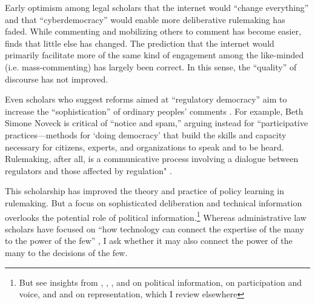 Early optimism among legal scholars that the internet would ``change everything'' \citep{Johnson1998} and that ``cyberdemocracy''  would enable more deliberative rulemaking has faded.  
While commenting and mobilizing others to comment has become easier, \citet{Coglianese2006} finds that little else has changed. %
The prediction that the internet would primarily facilitate more of the same kind of engagement among the like-minded (i.e. mass-commenting) \citep{Sunstein2001} has largely been correct. In this sense, the ``quality'' of discourse has not improved.

Even scholars who suggest reforms aimed at ``regulatory democracy'' aim to increase the ``sophistication'' of ordinary peoples' comments \citep{Cuellar2014, Johnson2013}. For example, Beth Simone Noveck \citeyear{Noveck2004} 
is critical of ``notice and spam,'' arguing instead for ``participative practices---methods for `doing democracy' that build the skills and capacity necessary for citizens, experts, and organizations to speak and to be heard. Rulemaking, after all, is a communicative process involving a dialogue between regulators and those affected by regulation" \citet[p. 3]{Noveck2005}.

This scholarship has improved the theory and practice of policy learning in rulemaking. But a focus on sophisticated deliberation and technical information overlooks the potential role of political information.\footnote{But see insights from \citet{Golden1998}, \citet{Nelson2012}, \citet{Rauch2016}, and \citet{Potter2017} on political information, \citet{Cuellar2014} on participation and voice, and \citet{Reich1966} and \citet{Seifter2016UCLA} on representation, which I review elsewhere} Whereas administrative law scholars have focused on ``how technology can connect the expertise of the many to the power of the few'' \citep{Noveck2009}, I ask whether it may also connect the power of the many to the decisions of the few.